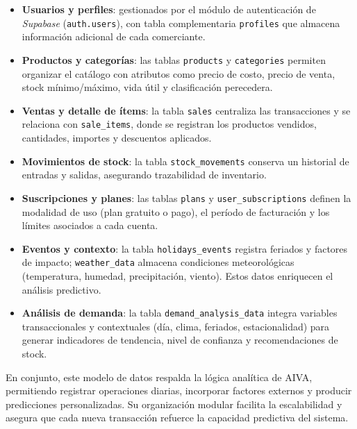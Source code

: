 \begin{itemize}
    \item \textbf{Usuarios y perfiles}: gestionados por el módulo de autenticación de \textit{Supabase} (\texttt{auth.users}), con tabla complementaria \texttt{profiles} que almacena información adicional de cada comerciante.
    \item \textbf{Productos y categorías}: las tablas \texttt{products} y \texttt{categories} permiten organizar el catálogo con atributos como precio de costo, precio de venta, stock mínimo/máximo, vida útil y clasificación perecedera.
    \item \textbf{Ventas y detalle de ítems}: la tabla \texttt{sales} centraliza las transacciones y se relaciona con \texttt{sale\_items}, donde se registran los productos vendidos, cantidades, importes y descuentos aplicados.
    \item \textbf{Movimientos de stock}: la tabla \texttt{stock\_movements} conserva un historial de entradas y salidas, asegurando trazabilidad de inventario.
    \item \textbf{Suscripciones y planes}: las tablas \texttt{plans} y \texttt{user\_subscriptions} definen la modalidad de uso (plan gratuito o pago), el período de facturación y los límites asociados a cada cuenta.
    \item \textbf{Eventos y contexto}: la tabla \texttt{holidays\_events} registra feriados y factores de impacto; \texttt{weather\_data} almacena condiciones meteorológicas (temperatura, humedad, precipitación, viento). Estos datos enriquecen el análisis predictivo.
    \item \textbf{Análisis de demanda}: la tabla \texttt{demand\_analysis\_data} integra variables transaccionales y contextuales (día, clima, feriados, estacionalidad) para generar indicadores de tendencia, nivel de confianza y recomendaciones de stock.
\end{itemize}

En conjunto, este modelo de datos respalda la lógica analítica de AIVA, permitiendo registrar operaciones diarias, incorporar factores externos y producir predicciones personalizadas. Su organización modular facilita la escalabilidad y asegura que cada nueva transacción refuerce la capacidad predictiva del sistema.

